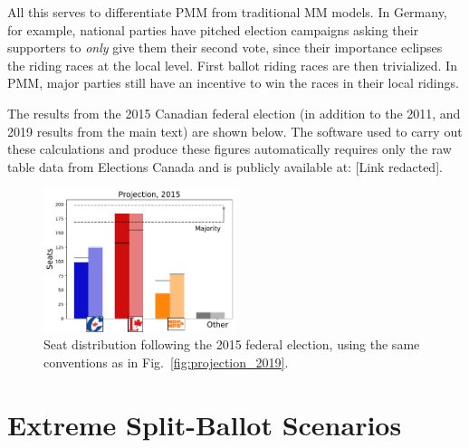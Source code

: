 All this serves to differentiate PMM from traditional MM models.
In Germany, for example, national parties have pitched election campaigns asking their supporters to \emph{only} give them their second vote, since their importance eclipses the riding races at the local level. First ballot riding races are then trivialized.
In PMM, major parties still have an incentive to win the races in their local ridings.


The results from the 2015 Canadian federal election (in addition to the 2011, and 2019 results from the main text) are shown below.
The software used to carry out these calculations and produce these figures automatically requires only the raw table data from Elections Canada and is publicly available at:
[Link redacted].

\begin{figure}[h!]
  \includegraphics[width=0.50\textwidth,clip]{PR_calcs/data/raw_2015/PMM_out/PMM_projections}
  \caption{ Seat distribution following the 2015 federal election, using the same conventions as in Fig.~\ref{fig:projection_2019}.}
\label{fig:projection_2015}
\end{figure}



\section{Extreme Split-Ballot Scenarios}

